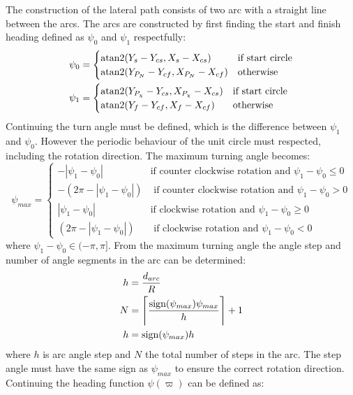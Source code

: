 The construction of the lateral path consists of two arc with a straight line between the arcs. The arcs are constructed by first finding the start and finish heading defined as $\psi_0$ and $\psi_1$ respectfully:
\begin{subequations}
\begin{align}
\psi_0 &= \begin{cases}
\atan2(Y_s-Y_{cs},X_s-X_{cs}) & \text{if start circle} \\
\atan2(Y_{P_N}-Y_{cf},X_{P_N}-X_{cf}) & \text{otherwise}
\end{cases}\\
\psi_1 &= \begin{cases}
\atan2(Y_{P_\chi}-Y_{cs},X_{P_{\chi}}-X_{cs}) & \text{if start circle} \\
\atan2(Y_{f}-Y_{cf},X_{f}-X_{cf}) & \text{otherwise}
\end{cases}
\end{align}
\end{subequations}
Continuing the turn angle must be defined, which is the difference between $\psi_1$ and $\psi_0$. However the periodic behaviour of the unit circle must respected, including the rotation direction. The maximum turning angle becomes:
\begin{equation}
\psi_{max} = \begin{cases}
-|\psi_1 - \psi_0| & \text{if counter clockwise rotation and } \psi_1 - \psi_0 \leq 0 \\
-(2\pi - |\psi_1-\psi_0|) & \text{ if counter clockwise rotation and } \psi_1 - \psi_0 > 0 \\
|\psi_1 - \psi_0| & \text{if clockwise rotation and } \psi_1 - \psi_0 \geq 0 \\
(2\pi - |\psi_1-\psi_0|) & \text{ if clockwise rotation and } \psi_1 - \psi_0 < 0
\end{cases}
\end{equation}
where $\psi_1-\psi_0 \in(-\pi,\pi]$. From the maximum turning angle the angle step and number of angle segments in the arc can be determined:
\begin{subequations}
\begin{align}
h &= \frac{d_{arc}}{R} \\
N &= \ceil[\Bigg]{\frac{\text{sign}(\psi_{max})\psi_{max}}{h}} + 1 \\
h &= \text{sign}(\psi_{max})h
\end{align}
\end{subequations}
where $h$ is arc angle step and $N$ the total number of steps in the arc. The step angle must have the same sign as $\psi_{max}$ to ensure the correct rotation direction. Continuing the heading function $\psi(\varpi)$ can be defined as:
